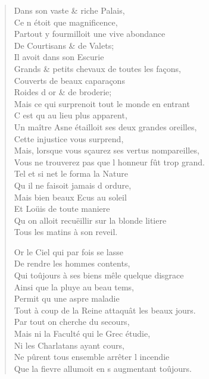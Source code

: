 \documentclass[14pt,a4paper]{memoir}
\begin{document}
{{\begin{otherlanguage}{french}
\begin{verse}
\vin Dans son vaste \& riche Palais, \\
\vin Ce n\textquotesingle{} étoit que magnificence, \\
Partout y fourmilloit une vive abondance \\
\vin De Courtisans \& de Valets; \\
\vin Il avoit dans son Escurie \\
Grands \& petits chevaux de toutes les façons, \\
\vin Couverts de beaux caparaçons \\
\vin Roides d\textquotesingle{} or \& de broderie; \\
Mais ce qui surprenoit tout le monde en entrant \\
\vin C\textquotesingle{} est qu\textquotesingle{} au lieu plus apparent, \\
Un maître Asne étailloit ses deux grandes oreilles, \\
\vin Cette injustice vous surprend, \\
Mais, lorsque vous sçaurez ses vertus nompareilles, \\
Vous ne trouverez pas que l\textquotesingle{} honneur fût trop grand. \\
\vin Tel et si net le forma la Nature \\
\vin Qu\textquotesingle{} il ne faisoit jamais d\textquotesingle{} ordure, \\
\vin Mais bien beaux Ecus au soleil \\
\vin Et Loüis de toute maniere \\
Qu\textquotesingle{} on alloit recuëillir sur la blonde litiere \\
\vin Tous les matins à son reveil.

\vin Or le Ciel qui par fois se lasse \\
\vin De rendre les hommes contents, \\
Qui toûjours à ses biens mêle quelque disgrace \\
\vin Ainsi que la pluye au beau tems, \\
\vin Permit qu\textquotesingle{} une aspre maladie \\
Tout à coup de la Reine attaquât les beaux jours. \\
\vin Par tout on cherche du secours, \\
Mais ni la Faculté qui le Grec étudie, \\
\vin Ni les Charlatans ayant cours, \\
Ne pûrent tous ensemble arrêter l\textquotesingle{} incendie \\
Que la fievre allumoit en s\textquotesingle{} augmentant toûjours.


\end{verse}
\end{otherlanguage}}}
\end{document}
